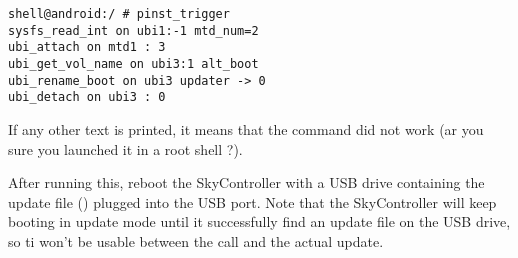 \texttt{shell@android:/ \# pinst\_trigger \\
sysfs\_read\_int on ubi1:-1 mtd\_num=2 \\
ubi\_attach on mtd1 : 3 \\
ubi\_get\_vol\_name on ubi3:1 alt\_boot \\
ubi\_rename\_boot on ubi3 updater -> 0 \\
ubi\_detach on ubi3 : 0}

If any other text is printed, it means that the command did not work (ar you sure you launched it in a root shell ?).

After running this, reboot the SkyController with a USB drive containing the update file () plugged into the USB port. Note that the SkyController will keep booting in update mode until it successfully find an update file on the USB drive, so ti won't be usable between the  call and the actual update.


